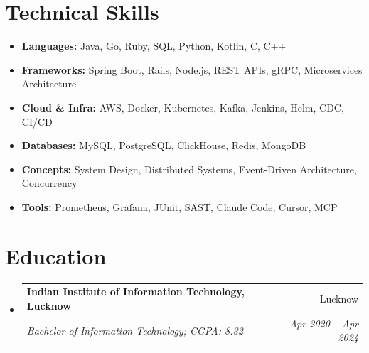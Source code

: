 \documentclass[letterpaper,10pt]{article}
\makeatletter
\newcommand{\resumeSubheading}[4]{
  \item
    \begin{tabular*}{0.97\textwidth}{l@{\extracolsep{\fill}}r}
      \textbf{#1} & #2 \\
      \textit{\small#3} & \textit{\small #4} \\
    \end{tabular*}
}
\newcommand{\resumeSubHeadingListStart}{\vspace{-4pt}\begin{itemize}[leftmargin=*,itemsep=3pt,parsep=0pt]}
\newcommand{\resumeSubHeadingListEnd}{\end{itemize}}
\makeatother
\begin{document}
%
\section{Technical Skills}
\begin{itemize}[leftmargin=*, itemsep=1pt, parsep=0pt]
      \selectfont\small
      \setlength\itemsep{0em}
      \setlength\parsep{0em}
      \item \textbf{Languages:} Java, Go, Ruby, SQL, Python, Kotlin, C, C++
      \item \textbf{Frameworks:} Spring Boot, Rails, Node.js, REST APIs, gRPC, Microservices Architecture
      \item \textbf{Cloud \& Infra:} AWS, Docker, Kubernetes, Kafka, Jenkins, Helm, CDC, CI/CD
      \item \textbf{Databases:} MySQL, PostgreSQL, ClickHouse, Redis, MongoDB
      \item \textbf{Concepts:} System Design, Distributed Systems, Event-Driven Architecture, Concurrency
      \item \textbf{Tools:} Prometheus, Grafana, JUnit, SAST, Claude Code, Cursor, MCP
\end{itemize}

\section{Education}
\resumeSubHeadingListStart
\resumeSubheading
{Indian Institute of Information Technology, Lucknow}{Lucknow}
{Bachelor of Information Technology;  CGPA: 8.32}{Apr 2020 -- Apr 2024}
\resumeSubHeadingListEnd
\end{document}
